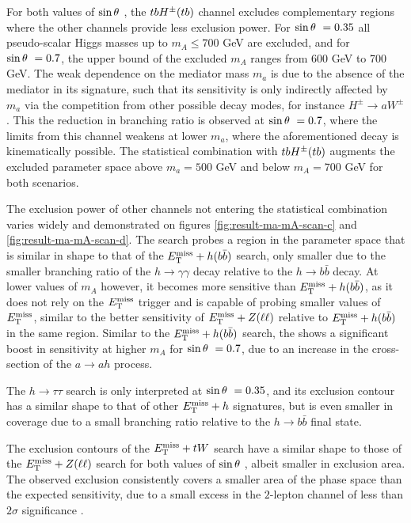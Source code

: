For both values of $\sin\theta~$, the $tbH^{\pm}(tb)$ channel excludes complementary regions where the other channels provide less exclusion power. For $\sin\theta~=0.35$ all pseudo-scalar Higgs masses up to $m_A\le 700$ GeV are excluded, and for $\sin\theta~=0.7$, the upper bound of the excluded $m_A$ ranges from 600 GeV to 700 GeV. The weak dependence on the mediator mass $m_a$ is due to the absence of the mediator in its signature, such that its sensitivity is only indirectly affected by $m_a$ via the competition from other possible decay modes, for instance $H^{\pm}\rightarrow aW^{\pm}$. This the reduction in branching ratio is observed at $\sin\theta~=0.7$, where the limits from this channel weakens at lower $m_a$, where the aforementioned decay is kinematically possible. The statistical combination with $tbH^{\pm}(tb)$ augments the excluded parameter space above $m_a=500$ GeV and below $m_A=700$ GeV for both scenarios. 

The exclusion power of other channels not entering the statistical combination varies widely and demonstrated on figures \ref{fig:result-ma-mA-scan-c} and \ref{fig:result-ma-mA-scan-d}. The \monohgamgam search probes a region in the parameter space that is similar in shape to that of the $E_{\mathrm{T}}^{\mathrm{miss}}+h(b\bar{b})$ search, only smaller due to the smaller branching ratio of the $h\rightarrow \gamma\gamma$ decay relative to the $h\rightarrow b\bar{b}$ decay. At lower values of $m_A$ however, it becomes more sensitive than $E_{\mathrm{T}}^{\mathrm{miss}}+h(b\bar{b})$, as it does not rely on the $E_{\mathrm{T}}^{\mathrm{miss}}$ trigger and is capable of probing smaller values of $E_{\mathrm{T}}^{\mathrm{miss}}$, similar to the better sensitivity of $E_{\mathrm{T}}^{\mathrm{miss}}+Z(\ell\ell)$ relative to $E_{\mathrm{T}}^{\mathrm{miss}}+h(b\bar{b})$ in the same region. Similar to the $E_{\mathrm{T}}^{\mathrm{miss}}+h(b\bar{b})$ search, the \monohgamgam shows a significant boost in sensitivity at higher $m_A$ for $\sin\theta~=0.7$, due to an increase in the cross-section of the $a\rightarrow ah$ process. 

The $h\rightarrow \tau\tau$ search is only interpreted at $\sin\theta~ = 0.35$, and its exclusion contour has a similar shape to that of other $E_{\mathrm{T}}^{\mathrm{miss}}+h$ signatures, but is even smaller in coverage due to a small branching ratio relative to the $h\rightarrow b\bar{b}$ final state. 

The exclusion contours of the $E_{\mathrm{T}}^{\mathrm{miss}}+tW$ search have a similar shape to those of the $E_{\mathrm{T}}^{\mathrm{miss}}+Z(\ell\ell)$ search for both values of $\sin\theta~$, albeit smaller in exclusion area. The observed exclusion consistently covers a smaller area of the phase space than the expected sensitivity, due to a small excess in the $2$-lepton channel of less than $2\sigma$ significance \cite{EXOT-2018-43}. 

